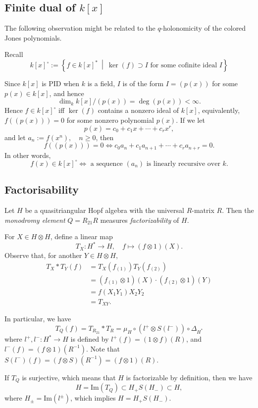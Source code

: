 
\subsection*{Finite dual of $k[x]$}

The following observation might be related to the $q$-holonomicity of the colored Jones polynomials.

Recall
\[
k[x]^\circ := \left\{ f \in k[x]^* \ \middle|\ \ker(f) \supset I \text{ for some cofinite ideal } I \right\}
\]

Since $k[x]$ is PID when $k$ is a field, $I$ is of the form $I = (p(x))$ for some $p(x) \in k[x]$, and hence
\[
\dim_k k[x] / (p(x)) = \deg(p(x)) < \infty.
\]
Hence $f \in k[x]^\circ$ iff $\ker(f)$ contains a nonzero ideal of $k[x]$, equivalently, $f((p(x))) = 0$ for some nonzero polynomial $p(x)$.
If we let
\[
p(x) = c_0 + c_1 x + \cdots + c_r x^r,
\]
and let $a_n := f(x^n), \quad n \geq 0$, then
\[
f((p(x))) = 0 \Longleftrightarrow c_0 a_n + c_1 a_{n+1} + \cdots + c_r a_{n+r} = 0.
\]
In other words,
\[
f(x) \in k[x]^\circ \Longleftrightarrow \text{ a sequence } (a_n) \text{ is linearly recursive over } k.
\]


\subsection*{Factorisability}

Let $H$ be a quasitriangular Hopf algebra with the universal $R$-matrix $R$.
Then the \emph{monodromy element} $Q = R_{21} R$ measures \emph{factorizability} of $H$.

For $X \in H \otimes H$, define a linear map 
\[
T_X : H^* \rightarrow H, \quad f \mapsto (f \otimes 1)(X).
\]
Observe that, for another $Y \in H \otimes H$,
\begin{align*}
    T_X * T_Y (f) & = T_X(f_{(1)})T_Y(f_{(2)}) \\
    & = (f_{(1)} \otimes 1)(X) \cdot (f_{(2)} \otimes 1)(Y) \\
    & = f(X_1 Y_1) X_2 Y_2 \\
    & = T_{XY}.
\end{align*}

In particular, we have
\[
T_Q(f) = T_{R_{21}} * T_{R} = \mu_H  \circ (l^+ \otimes S(l^-)) \circ \Delta_{H^*}
\]
where $l^+, l^-: H^* \rightarrow H$ is defined by $l^+(f) = (1 \otimes f)(R)$, and $l^-(f) = (f \otimes 1)(R^{-1})$.
Note that $S(l^-)(f) = (f \otimes S)(R^{-1}) = (f \otimes 1)(R)$.

If $T_Q$ is surjective, which means that $H$ is factorizable by definition, then we have
\[
H = \mathrm{Im}(T_Q) \subset H_+ S(H_-) \subset H,
\]
where $H_\pm = \mathrm{Im} (l^\pm)$, which implies $H = H_+ S(H_-)$.


